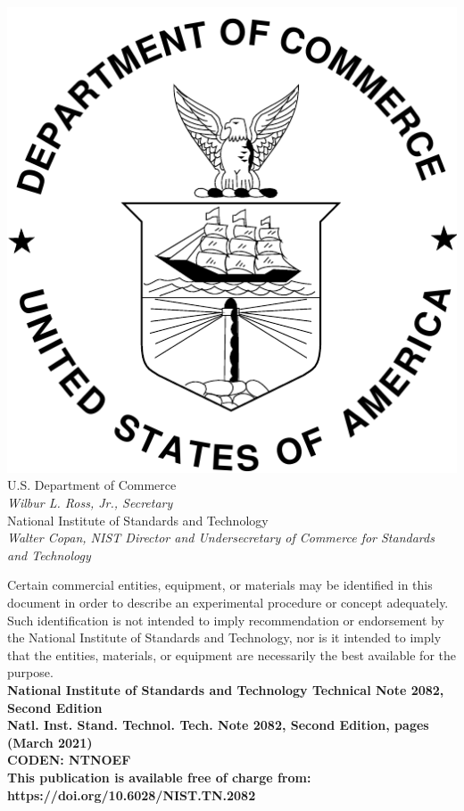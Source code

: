 \documentclass[12pt]{article}
\newcommand{\pubnumber}{2082, Second Edition}
\newcommand{\DOI}{https://doi.org/10.6028/NIST.TN.2082}
\newcommand{\monthyear}{March 2021}
\begin{document}
\begin{titlepage}
\begin{flushright}
\includegraphics[width=0.18\linewidth]{DoC-logo}\\
\vfill
\footnotesize U.S. Department of Commerce\\
\textit{Wilbur L. Ross, Jr., Secretary}\\
\vspace{10pt}
National Institute of Standards and Technology\\
\textit{Walter Copan, NIST Director and Undersecretary of Commerce for Standards and Technology}
\end{flushright}
\end{titlepage}

\begin{titlepage}
\begin{flushright}
\footnotesize  Certain commercial entities, equipment, or materials may be identified in this document in order to describe an experimental procedure or concept adequately. Such identification is not intended to imply recommendation or endorsement by the National Institute of Standards and Technology, nor is it intended to imply that the entities, materials, or equipment are necessarily the best available for the purpose.\\
\vfill
\normalsize \textbf{National Institute of Standards and Technology Technical Note \pubnumber\\
Natl. Inst. Stand. Technol. Tech. Note \pubnumber, \pageref{LastPage} pages (\monthyear)} \\
\textbf{CODEN: NTNOEF}\\
\vspace{12pt}
\textbf{This publication is available free of charge from: \DOI}
\vfill
\end{flushright}
\end{titlepage}
\end{document}
